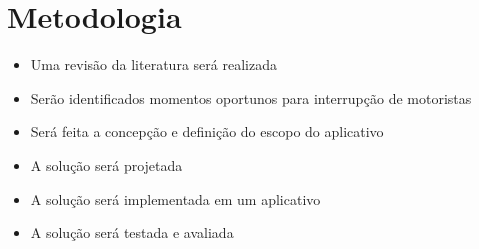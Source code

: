 \chapter{Metodologia}
\label{ref:metodologia}

\begin{itemize}
  \item Uma revisão da literatura será realizada
  \item Serão identificados momentos oportunos para interrupção de motoristas
  \item Será feita a concepção e definição do escopo do aplicativo
  \item A solução será projetada
  \item A solução será implementada em um aplicativo
  \item A solução será testada e avaliada

\end{itemize}
